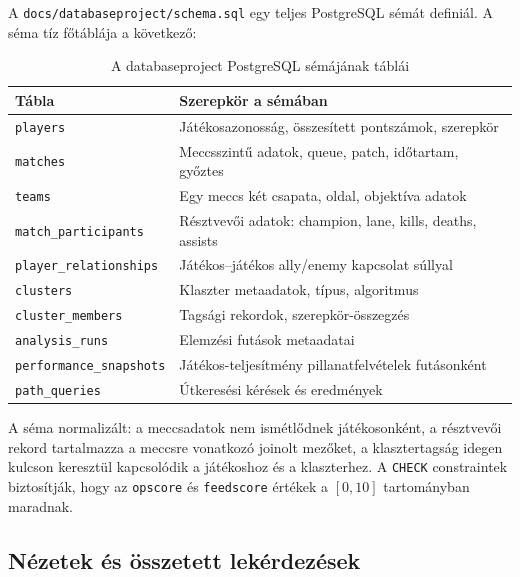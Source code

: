 ﻿\documentclass[a4paper,12pt]{report}
\begin{document}
A \texttt{docs/databaseproject/schema.sql} egy teljes PostgreSQL sémát definiál. A séma tíz főtáblája a következő:

\begin{table}[H]
\centering
\caption{A databaseproject PostgreSQL sémájának táblái}
\begin{tabularx}{\textwidth}{>{\raggedright\arraybackslash}p{4.5cm}X}
\toprule
\textbf{Tábla} & \textbf{Szerepkör a sémában} \\
\midrule
\texttt{players} & Játékosazonosság, összesített pontszámok, szerepkör \\
\texttt{matches} & Meccsszintű adatok, queue, patch, időtartam, győztes \\
\texttt{teams} & Egy meccs két csapata, oldal, objektíva adatok \\
\texttt{match\_participants} & Résztvevői adatok: champion, lane, kills, deaths, assists \\
\texttt{player\_relationships} & Játékos--játékos ally/enemy kapcsolat súllyal \\
\texttt{clusters} & Klaszter metaadatok, típus, algoritmus \\
\texttt{cluster\_members} & Tagsági rekordok, szerepkör-összegzés \\
\texttt{analysis\_runs} & Elemzési futások metaadatai \\
\texttt{performance\_snapshots} & Játékos-teljesítmény pillanatfelvételek futásonként \\
\texttt{path\_queries} & Útkeresési kérések és eredmények \\
\bottomrule
\end{tabularx}
\end{table}

A séma normalizált: a meccsadatok nem ismétlődnek játékosonként, a résztvevői rekord tartalmazza a meccsre vonatkozó joinolt mezőket, a klasztertagság idegen kulcson keresztül kapcsolódik a játékoshoz és a klaszterhez. A \texttt{CHECK} constraintek biztosítják, hogy az \texttt{opscore} és \texttt{feedscore} értékek a $[0,10]$ tartományban maradnak.

\subsection{Nézetek és összetett lekérdezések}
\end{document}
